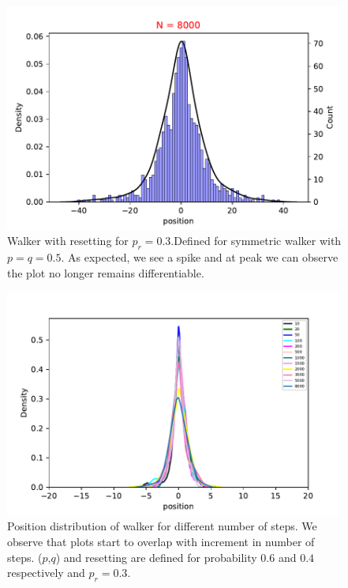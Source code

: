 \documentclass[showpacs,amsmath,amssymb,aps,pre,twocolumn]{revtex4-1}
\begin{document}
\begin{figure}[H]
    \centering
    \includegraphics[scale = 0.55]{reset_8000_sym.pdf}
    \caption{Walker with resetting for $p_r = 0.3$.Defined for symmetric walker with $p = q = 0.5$. As expected, we see a spike and at peak we can observe the plot no longer remains differentiable.}
    \label{fig:my_label}
\end{figure}



\begin{figure}[H]
    \centering
    \includegraphics[scale = 0.5]{universal.pdf}
    \caption{Position distribution of walker for different number of steps. We observe that plots start to overlap with increment in number of steps. ($p$,$q$) and resetting are defined for probability $0.6$ and $0.4$ respectively and $p_r = 0.3$. }
    \label{fig:my_label}
\end{figure}
\end{document}
